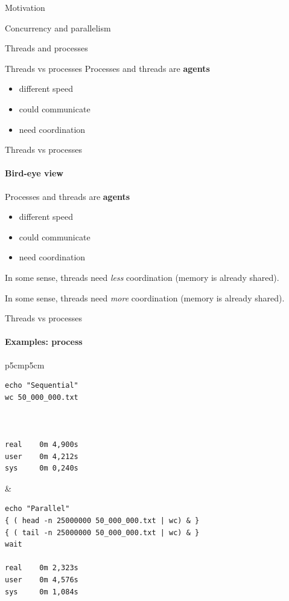 \begin{section}{Motivation}
\begin{section}{Concurrency and parallelism}
\begin{section}{Threads and processes}
\begin{frame}[t]{Threads vs processes}
Processes and threads are \textbf{agents}
\begin{itemize}
    \item different speed
    \item could communicate
    \item need coordination
\end{itemize}

\end{frame}



\begin{frame}[t,noframenumbering]{Threads vs processes}
\framesubtitle{Bird-eye view}

Processes and threads are \textbf{agents}
\begin{itemize}
    \item different speed
    \item could communicate
    \item need coordination
\end{itemize}

\pause
In some sense, threads need \textit{less} coordination (memory is already shared).

\pause
In some sense, threads need \textit{more} coordination (memory is already shared).
\end{frame}


\begin{frame}[fragile]{Threads vs processes}
\framesubtitle{Examples: process}

\begin{tabular}{p{5cm}p{5cm}}

\begin{lstlisting}
echo "Sequential"
wc 50_000_000.txt



real    0m 4,900s
user    0m 4,212s
sys     0m 0,240s
\end{lstlisting}

 & 

\begin{lstlisting}
echo "Parallel"
{ ( head -n 25000000 50_000_000.txt | wc) & }
{ ( tail -n 25000000 50_000_000.txt | wc) & }
wait

real    0m 2,323s
user    0m 4,576s
sys     0m 1,084s
\end{lstlisting}

\end{tabular}


\end{frame}
\end{section}
\end{section}
\end{section}
